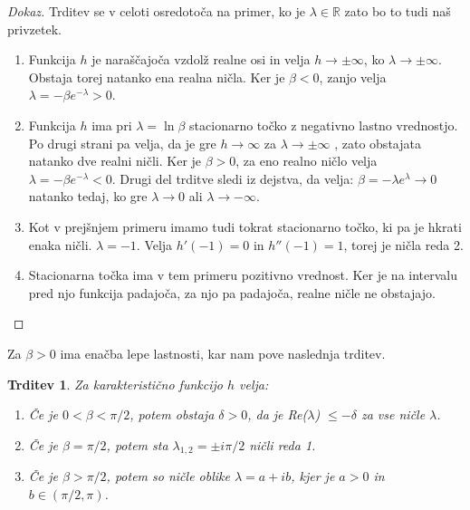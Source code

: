 \documentclass[12pt,a4paper]{amsart}
\theoremstyle{definition} %
\theoremstyle{plain} %
\newtheorem{trditev}[definicija]{Trditev}
\newcommand{\R}{\mathbb R}
\begin{document}
\begin{proof}[Dokaz]
    Trditev se v celoti osredotoča na primer, ko je $\lambda\in\R$ zato bo to tudi naš privzetek.
    \begin{enumerate}
        \item Funkcija $h$ je naraščajoča vzdolž realne osi in velja $h \to \pm \infty$, ko $\lambda \to \pm \infty$. Obstaja 
        torej natanko ena realna ničla. Ker je $\beta < 0$, zanjo velja $\lambda = -\beta e^{-\lambda} >0$.
        \item Funkcija $h$ ima pri $\lambda=\ln\beta$ stacionarno točko z negativno lastno vrednostjo. Po drugi strani pa velja, da je gre $h\to\infty$ za $\lambda\to\pm\infty$
        , zato obstajata natanko dve realni ničli. Ker je 
        $\beta > 0$, za eno realno ničlo velja $\lambda = -\beta e^{-\lambda} <0$. Drugi del trditve sledi iz dejstva, da velja:
        $ \beta = -\lambda e^{\lambda} \to 0$ natanko tedaj, ko gre $\lambda \to 0$ ali $\lambda \to -\infty$.
        \item Kot v prejšnjem primeru imamo tudi tokrat stacionarno točko, ki pa je hkrati enaka ničli. $\lambda = -1$. Velja $h'(-1)=0$ in $h''(-1)=1$, torej
        je ničla reda 2.
        \item Stacionarna točka ima v tem primeru pozitivno vrednost. Ker je na intervalu pred njo funkcija padajoča,
         za njo pa padajoča, realne ničle ne obstajajo. 
    \end{enumerate}
\end{proof}

Za $\beta > 0$ ima enačba lepe lastnosti, kar nam pove naslednja trditev.

\begin{trditev}
    Za karakteristično funkcijo $h$ velja:
    \begin{enumerate}
        \item Če je $0<\beta < \pi /2$, potem obstaja $\delta > 0$, da je Re($\lambda$) $\leq -\delta$
        za vse ničle $\lambda$.
        \item Če je $\beta = \pi /2$, potem sta $\lambda_{1,2}=\pm i\pi /2$ ničli reda 1.
        \item Če je $\beta > \pi /2$, potem so ničle oblike $\lambda = a + ib$, kjer je $a>0$ in 
         $b \in (\pi /2, \pi)$.
    \end{enumerate} 
\end{trditev}
\end{document}
